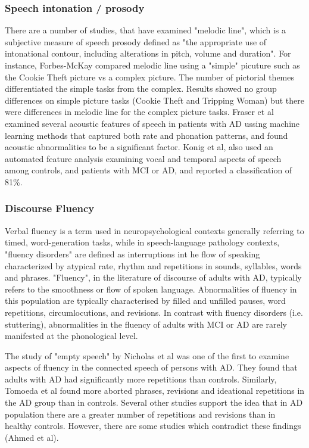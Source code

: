 \documentclass[12pt, twoside, a4paper]{article}
\begin{document}
\subsubsection{Speech intonation / prosody}
There are a number of studies, that have examined "melodic line", which is a subjective measure of speech prosody defined as "the appropriate use of intonational contour, including alterations in pitch, volume and duration". For instance, Forbes-McKay compared melodic line using a "simple" picuture such as the Cookie Theft picture vs a complex picture. The number of pictorial themes differentiated the simple tasks from the complex. Results showed no group differences on simple picture tasks (Cookie Theft and Tripping Woman) but there were differences in melodic line for the complex picture tasks. Fraser et al examined several acoustic features of speech in patients with AD ussing machine learning methods that captured both rate and phonation patterns, and found acoustic abnormalities to be a significant factor. Konig et al, also used an automated feature analysis examining vocal and temporal aspects of speech among controls, and patients with MCI or AD, and reported a classification of 81\%.
\subsubsection{Discourse Fluency}
Verbal fluency is a term used in neuropsychological contexts generally referring to timed, word-generation tasks, while in speech-language pathology contexts, "fluency disorders" are defined as interruptions int he flow of speaking characterized by atypical rate, rhythm and repetitions in sounds, syllables, words and phrases. "Fluency", in the literature of discourse of adults with AD, typically refers to the smoothness or flow of spoken language. Abnormalities of fluency in this population are typically characterised by filled and unfilled pauses, word repetitions, circumlocutions, and revisions. In contrast with fluency disorders (i.e. stuttering), abnormalities in the fluency of adults with MCI or AD are rarely manifested at the phonological level.
\par
The study of "empty speech" by Nicholas et al was one of the first to examine aspects of fluency in the connected speech of persons with AD. They found that adults with AD had significantly more repetitions than controls. Similarly, Tomoeda et al found more aborted phrases, revisions and ideational repetitions in the AD group than in controls. Several other studies support the idea that in AD population there are a greater number of repetitions and revisions than in healthy controls. However, there are some studies which contradict these findings (Ahmed et al).
\par
\end{document}
